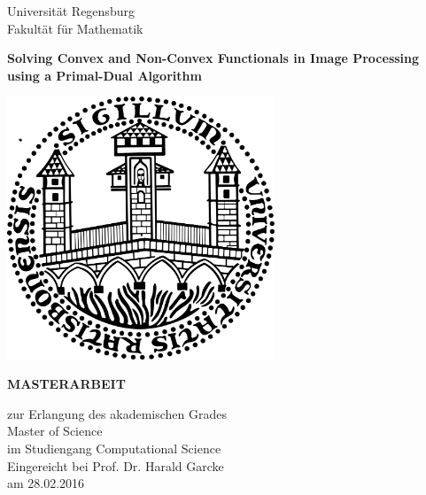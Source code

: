 \documentclass{scrreprt}
\begin{document}

\begin{titlepage} %

    \begin{center}
        \begin{Large}
            Universit\"at Regensburg\\
            Fakult\"at f\"ur Mathematik\\
        \end{Large}
        \vspace{0.5cm}
        \begin{huge}
            \textbf{Solving Convex and Non-Convex Functionals in Image Processing using a Primal-Dual Algorithm}
        \end{huge}
        \vspace{0.5cm}
        \begin{center}
        \includegraphics[width=8cm]{img/sigillum.png}
        \vspace{0.5cm}\\
        \begin{Large}
            \textbf{MASTERARBEIT}\\
        \end{Large}
        \vspace{0.5cm}
        \begin{large}
            zur Erlangung des akademischen Grades\\
            Master of Science\\
            im Studiengang Computational Science\\
            \vspace{0.5cm}
            Eingereicht bei Prof. Dr. Harald Garcke\\
            am 28.02.2016
        \end{large}
        \vspace{0.5cm}
    \end{center}


\end{center}
\end{titlepage}
\end{document}
